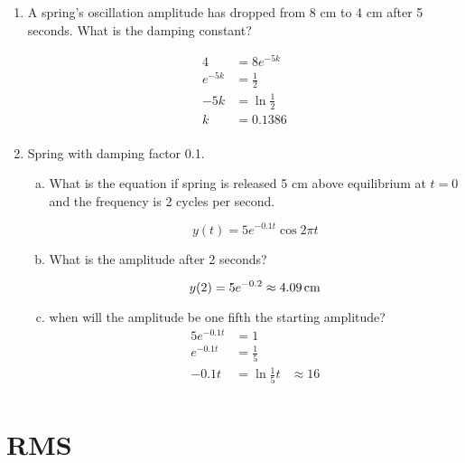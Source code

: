 \documentclass{exam}
\begin{document}
  \begin{enumerate}
    \item A spring's oscillation amplitude has dropped from 8 cm to 4 cm after 5 seconds.  What is the damping constant?
      \begin{solution}
        \begin{align*}
          4       & = 8 e^{-5k} \\
          e^{-5k} & = \frac{1}{2} \\
          -5k     & = \ln \frac{1}{2} \\
          k       & = 0.1386 \\
        \end{align*}
      \end{solution}

    \item Spring with damping factor 0.1.
      \begin{enumerate}[(a)]
        \item What is the equation if spring is released 5 cm above equilibrium at $t = 0$ and the frequency is 2 cycles
          per second.

          \begin{solution}
            \[
              y(t) = 5 e^{-0.1 t} \cos 2 \pi t
            \]
          \end{solution}

        \item What is the amplitude after 2 seconds?
          \begin{solution}
            \[
              y(2) = 5 e^{-0.2} \approx \unit[4.09]{cm}
            \]
          \end{solution}

        \item when will the amplitude be one fifth the starting amplitude?
          \begin{align*}
            5 e^{-0.1 t} & = 1 \\
            e^{-0.1 t}   & = \frac{1}{5} \\
            -0.1 t       & = \ln \frac{1}{5}
            t            & \approx 16 \\
          \end{align*}
      \end{enumerate}
  \end{enumerate}

  \section{RMS}
\end{document}
